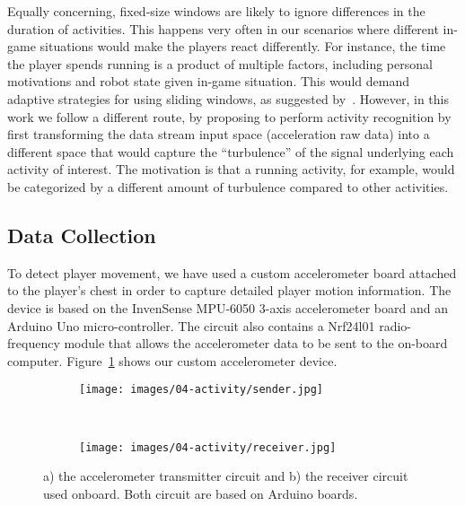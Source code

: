 Equally concerning, fixed-size windows are likely to ignore differences in the duration of activities. This happens very often in our scenarios where different in-game situations would make the players react differently. For instance, the time the player spends running is a product of multiple factors, including personal motivations and robot state given in-game situation. This would demand adaptive strategies for using sliding windows, as suggested by~\cite{noor_adaptive_2016}. However, in this work we follow a different route, by proposing to perform activity recognition by first transforming the data stream input space (acceleration raw data) into a different space that would capture the ``turbulence'' of the signal underlying each activity of interest. The motivation is that a running activity, for example, would be categorized by a different amount of turbulence compared to other activities.

\subsection{Data Collection}\label{datacollection}

To detect player movement, we have used a custom accelerometer board attached to the player's chest in order to capture detailed player motion information. The device is based on the InvenSense MPU-6050 3-axis accelerometer board and an Arduino Uno micro-controller. The circuit also contains a Nrf24l01 radio-frequency module that allows the accelerometer data to be sent to the on-board computer. Figure~\ref{fig:the_accelerometer} shows our custom accelerometer device.

\begin{figure}[H]
      \centering
      \begin{subfigure}[t]{0.5\textwidth}
      	\centering
	    \texttt{[image: images/04-activity/sender.jpg]}
	    \caption{}
	  \end{subfigure}
	  ~
	  \begin{subfigure}[t]{0.5\textwidth}
      	\centering
	    \texttt{[image: images/04-activity/receiver.jpg]}
	    \caption{}
	  \end{subfigure}
      \caption{a) the accelerometer transmitter circuit and b) the receiver circuit used onboard. Both circuit are based on Arduino boards.}\label{fig:the_accelerometer}
\end{figure}

